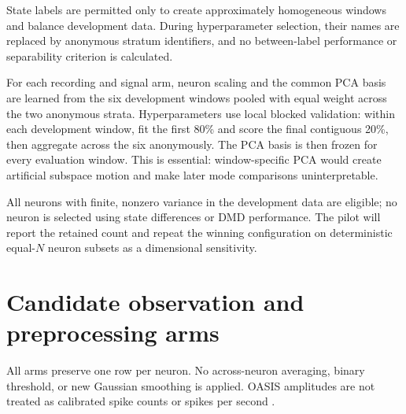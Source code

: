 \documentclass[11pt,a4paper]{article}
\begin{document}
State labels are permitted only to create approximately homogeneous windows and
balance development data. During hyperparameter selection, their names are
replaced by anonymous stratum identifiers, and no between-label performance or
separability criterion is calculated.

For each recording and signal arm, neuron scaling and the common PCA basis are
learned from the six development windows pooled with equal weight across the two
anonymous strata. Hyperparameters use local blocked validation: within each
development window, fit the first 80\% and score the final contiguous 20\%, then
aggregate across the six anonymously. The PCA basis is then frozen for every
evaluation window.
This is essential: window-specific PCA would create artificial subspace motion
and make later mode comparisons uninterpretable.

All neurons with finite, nonzero variance in the development data are eligible;
no neuron is selected using state differences or DMD performance. The pilot will
report the retained count and repeat the winning configuration on deterministic
equal-$N$ neuron subsets as a dimensional sensitivity.

\section{Candidate observation and preprocessing arms}

All arms preserve one row per neuron. No across-neuron averaging, binary
threshold, or new Gaussian smoothing is applied. OASIS amplitudes are not treated
as calibrated spike counts or spikes per second \citep{friedrich2017,kiyooka2026}.
\end{document}
